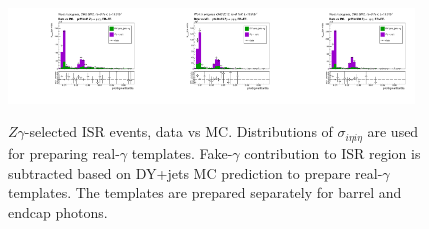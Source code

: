 \begin{figure}[htb]
\begin{center}
\includegraphics[width=0.32\textwidth]{../figs/figs_v11/MUON_ZGamma/PrepareYields/c_TotalDATAvsMC_EtaCommon__phoSigmaIEtaIEtaFSR_EXCLUDED_pt35to45_.pdf}\includegraphics[width=0.32\textwidth]{../figs/figs_v11/MUON_ZGamma/PrepareYields/c_TotalDATAvsMC_EtaCommon__phoSigmaIEtaIEtaFSR_EXCLUDED_pt45to55_.pdf}\includegraphics[width=0.32\textwidth]{../figs/figs_v11/MUON_ZGamma/PrepareYields/c_TotalDATAvsMC_EtaCommon__phoSigmaIEtaIEtaFSR_EXCLUDED_pt55to500_.pdf}\\
  \caption{$Z\gamma$-selected ISR events, data vs MC. Distributions of $\sigma_{i\eta i \eta}$ are used for preparing real-$\gamma$ templates. Fake-$\gamma$ contribution to ISR region is subtracted based on DY+jets MC prediction to prepare real-$\gamma$ templates. The templates are prepared separately for barrel and endcap photons.}
  \label{fig:Zg_ISR_phoSigmaIEtaIEta}
  \end{center}
\end{figure}
